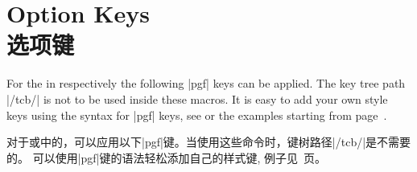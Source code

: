 
\section{Option Keys\\选项键}\label{sec:optkeys}%


For the  in  respectively 
the following |pgf| keys can be applied. The key tree path |/tcb/| is not to
be used inside these macros. It is easy to add your own style keys using
the syntax for |pgf| keys, see \cite{tantau:tikz_and_pgf,sturm:latex} or the examples
starting from page~\pageref{sec:latextutorial}.

对于或中的，可以应用以下|pgf|键。当使用这些命令时，键树路径|/tcb/|是不需要的。%
可以使用|pgf|键的语法轻松添加自己的样式键, 例子见~\pageref{sec:latextutorial}页。%


